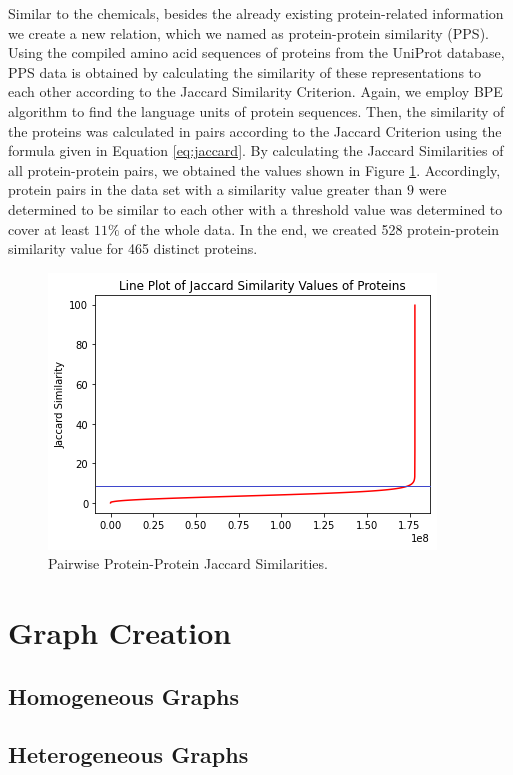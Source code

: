 Similar to the chemicals, besides the already existing protein-related information we create a new relation, which we named as protein-protein similarity (PPS). Using the compiled amino acid  sequences of proteins from the UniProt database, PPS data is obtained by calculating the similarity of these representations to each other according to the Jaccard Similarity Criterion. Again, we employ BPE algorithm to find the language units of protein sequences. Then, the similarity of the proteins was calculated in pairs according to the Jaccard Criterion using the formula given in Equation \ref{eq:jaccard}. By calculating the Jaccard Similarities of all protein-protein pairs, we obtained the values shown in Figure \ref{fig:pps}. Accordingly, protein pairs in the data set with a similarity value greater than $9$ were determined to be similar to each other with a threshold value was determined to cover at least $11\%$ of the whole data. In the end, we created 528 protein-protein similarity value for 465 distinct proteins.


\begin{figure}
    \centering
        \includegraphics[width=0.5\linewidth]{chapters/materials_and_methods/figures/pps_line.png}
    \caption{Pairwise Protein-Protein Jaccard Similarities.}
    \label{fig:pps}
\end{figure}

\section{Graph Creation}
\subsection{Homogeneous Graphs}



\subsection{Heterogeneous Graphs}


